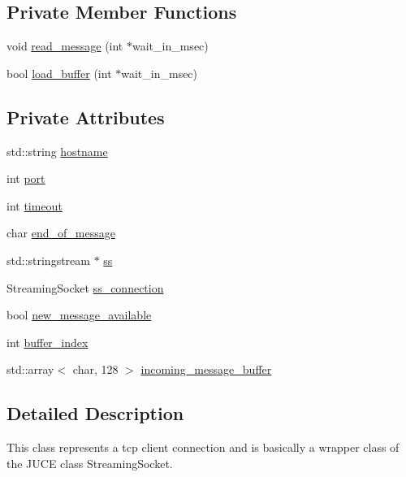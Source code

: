 \subsection*{Private Member Functions}
\begin{DoxyCompactItemize}
\item 
void \hyperlink{classSSR_1_1TCP__connection_aa9a40255447f6bad172a985d99c23ca5}{read\-\_\-message} (int $\ast$wait\-\_\-in\-\_\-msec)
\item 
bool \hyperlink{classSSR_1_1TCP__connection_a0e92f67aebe07f4b2c440c13c153234d}{load\-\_\-buffer} (int $\ast$wait\-\_\-in\-\_\-msec)
\end{DoxyCompactItemize}
\subsection*{Private Attributes}
\begin{DoxyCompactItemize}
\item 
std\-::string \hyperlink{classSSR_1_1TCP__connection_af7f5b7d55ac15ea615354eeb885512e2}{hostname}
\item 
int \hyperlink{classSSR_1_1TCP__connection_a30734c753f6d788ee25211ba6180380d}{port}
\item 
int \hyperlink{classSSR_1_1TCP__connection_ab190449951139b0705e2c7cd70de1903}{timeout}
\item 
char \hyperlink{classSSR_1_1TCP__connection_a375054b2058fea473aeda2df3f2ee8be}{end\-\_\-of\-\_\-message}
\item 
std\-::stringstream $\ast$ \hyperlink{classSSR_1_1TCP__connection_ae2920895ce251ebd5625a028c546ff8f}{ss}
\item 
Streaming\-Socket \hyperlink{classSSR_1_1TCP__connection_a3d22ed1c827d76a52914d4a76eae1b7f}{ss\-\_\-connection}
\item 
bool \hyperlink{classSSR_1_1TCP__connection_a5a9548fef4138d6cc2a71122ba115ec9}{new\-\_\-message\-\_\-available}
\item 
int \hyperlink{classSSR_1_1TCP__connection_a46f58bc3afd2d8f6087a8f5ab69170a5}{buffer\-\_\-index}
\item 
std\-::array$<$ char, 128 $>$ \hyperlink{classSSR_1_1TCP__connection_ac056f76e1f68c1d55c24c54da85b86f2}{incoming\-\_\-message\-\_\-buffer}
\end{DoxyCompactItemize}


\subsection{Detailed Description}
This class represents a tcp client connection and is basically a wrapper class of the J\-U\-C\-E class Streaming\-Socket.

